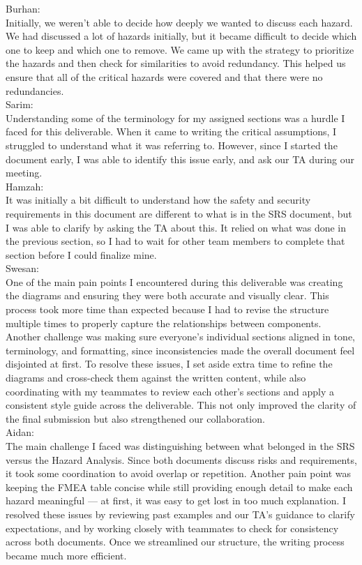 \documentclass{article}
\begin{document}
\begin{enumerate}
    Burhan: \\
    Initially, we weren't able to decide how deeply we wanted to discuss each hazard. We had discussed a lot of hazards initially, but it became difficult to decide which one to keep and which one to remove. We came up with the strategy to prioritize the hazards and then check for similarities to avoid redundancy. This helped us ensure that all of the critical hazards were covered and that there were no redundancies.  \\    

    Sarim: \\
Understanding some of the terminology for my assigned sections was a hurdle I faced for this deliverable. When it came to writing the critical assumptions, I struggled to understand what it was referring to. However, since I started the document early, I was able to identify this issue early, and ask our TA during our meeting.
\\    

Hamzah: \\
It was initially a bit difficult to understand how the safety and security requirements in this document are different to what is in the SRS document, but I was able to clarify by asking the TA about this. It relied on what was done in the previous section, so I had to wait for other team members to complete that section before I could finalize mine. 
\\   

Swesan: \\
One of the main pain points I encountered during this deliverable was creating the diagrams and ensuring they were both accurate and visually clear. This process took more time than expected because I had to revise the structure multiple times to properly capture the relationships between components. Another challenge was making sure everyone's individual sections aligned in tone, terminology, and formatting, since inconsistencies made the overall document feel disjointed at first. To resolve these issues, I set aside extra time to refine the diagrams and cross-check them against the written content, while also coordinating with my teammates to review each other's sections and apply a consistent style guide across the deliverable. This not only improved the clarity of the final submission but also strengthened our collaboration. 
\\


Aidan: \\
The main challenge I faced was distinguishing between what belonged in the SRS versus the Hazard Analysis. Since both documents discuss risks and requirements, it took some coordination to avoid overlap or repetition. Another pain point was keeping the FMEA table concise while still providing enough detail to make each hazard meaningful — at first, it was easy to get lost in too much explanation. I resolved these issues by reviewing past examples and our TA’s guidance to clarify expectations, and by working closely with teammates to check for consistency across both documents. Once we streamlined our structure, the writing process became much more efficient.
\\


\end{enumerate}
\end{document}
